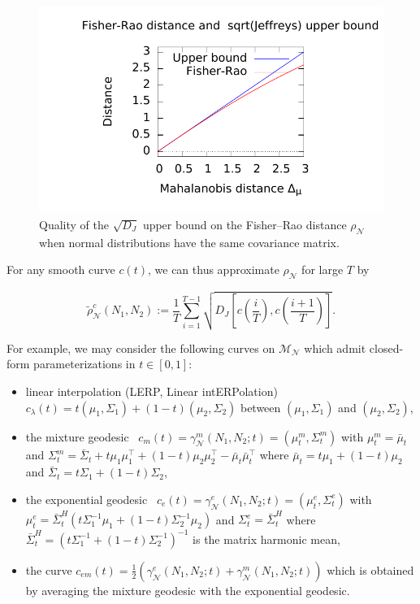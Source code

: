 \documentclass[entropy,article,accept,oneauthor,pdftex,entropy]{Definitions/mdpi}
\def\calM{\mathcal{M}}
\def\calN{\mathcal{N}}
\begin{document}
\begin{figure}[H]%
\includegraphics[width=0.7\columnwidth]{Plot-FRUBSameCovar.pdf}%
\caption{Quality of the $\sqrt{D_J}$ upper bound on the Fisher--Rao distance $\rho_\calN$ when normal distributions have the same covariance matrix.}%
\label{fig:ubsqrtJ}%
\end{figure}


For any smooth curve $c(t)$, we can thus approximate $\rho_\calN$ for large $T$ {by} %

\begin{equation}\label{eq:approx}
\boxed{\tilde\rho_\calN^c(N_1,N_2) := 
\frac{1}{T} \sum_{i=1}^{T-1} \sqrt{D_J\left[c\left(\frac{i}{T}\right),c\left(\frac{i+1}{T}\right)\right]}
.}
\end{equation}

For example, we may consider the following  curves on $\calM_{\calN}$ which admit closed-form parameterizations in $t\in[0,1]$:
\begin{itemize}
	\item linear interpolation (LERP, Linear intERPolation)
	$c_\lambda(t)=t (\mu_1,\Sigma_1)+(1-t)(\mu_2,\Sigma_2)$ 
	between $(\mu_1,\Sigma_1)$ and $(\mu_2,\Sigma_2)$,
	
	\item the mixture geodesic~\cite{nielsen2019jensen} $c_m(t)=\gamma^m_\calN(N_1,N_2;t)=(\mu_t^m,\Sigma_t^m)$ with
$\mu_t^m =\bar\mu_t$ and $\Sigma_t^m = \bar\Sigma_t+t\mu_1\mu_1^\top+(1-t)\mu_2\mu_2^\top-\bar\mu_t\bar\mu_t^\top$
where   $\bar\mu_t=t\mu_1+(1-t)\mu_2$ and $\bar\Sigma_t=t\Sigma_1+(1-t)\Sigma_2$,

\item the exponential geodesic~\cite{nielsen2019jensen} $c_e(t)=\gamma_\calN^e(N_1,N_2;t)=(\mu_t^e,\Sigma_t^e)$ with $\mu_t^e = \bar\Sigma_t^H (t\Sigma_1^{-1}\mu_1+(1-t)\Sigma_2^{-1}\mu_2)$
and $\Sigma_t^e =\bar\Sigma^H_t$
where $\bar\Sigma^H_t=(t\Sigma_1^{-1}+(1-t)\Sigma_2^{-1})^{-1}$ is the matrix harmonic mean,
\item the curve $c_{em}(t)=\frac{1}{2}\left(\gamma_\calN^e(N_1,N_2;t)+\gamma^m_\calN(N_1,N_2;t)\right)$ which is obtained by averaging the mixture geodesic with the exponential geodesic.
\end{itemize}
\end{document}
